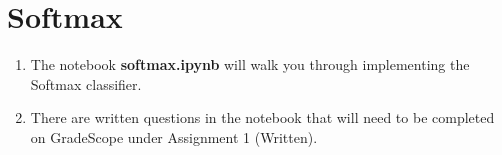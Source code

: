 \section{Softmax}

\begin{enumerate}
    \item {} The notebook \textbf{softmax.ipynb} will walk you through implementing the Softmax classifier.
    \item {} There are written questions in the notebook that will need to be completed on GradeScope under Assignment 1 (Written).
\end{enumerate}